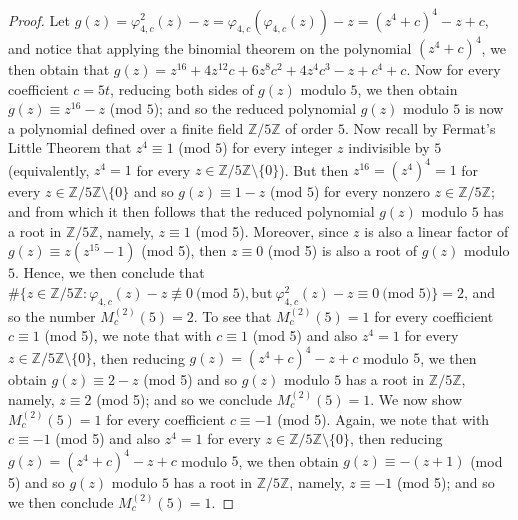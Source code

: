 \documentclass{article}
\theoremstyle{plain}
\theoremstyle{definition}
\begin{document}
\begin{proof}
Let $g(z)= \varphi_{4,c}^2(z)-z = \varphi_{4,c}(\varphi_{4,c}(z))-z = (z^4+c)^4 - z + c$, and notice that applying the binomial theorem on the polynomial $(z^4 + c)^4$, we then obtain that $g(z) = z^{16} + 4z^{12}c + 6z^8c^2 + 4z^4c^3 - z + c^4 + c$. Now for every coefficient $c=5t$, reducing both sides of $g(z)$ modulo $5$, we then obtain $g(z)\equiv z^{16} - z$ (mod $5$); and so the reduced polynomial $g(z)$ modulo $5$ is now a polynomial defined over a finite field $\mathbb{Z}\slash 5\mathbb{Z}$ of order $5$. Now recall by Fermat's Little Theorem that $z^4 \equiv 1$ (mod $5$) for every integer $z$ indivisible by $5$ (equivalently, $z^4 = 1$ for every $z\in \mathbb{Z}\slash5\mathbb{Z}\setminus \{0\}$). But then $z^{16}= (z^4)^4 = 1$ for every $z\in \mathbb{Z}\slash5\mathbb{Z}\setminus \{0\}$ and so $g(z)\equiv 1 - z$ (mod $5$) for every nonzero $z\in \mathbb{Z}\slash5\mathbb{Z}$; and from which it then follows that the reduced polynomial $g(z)$ modulo $5$ has a root in $\mathbb{Z}\slash 5\mathbb{Z}$, namely, $z\equiv 1$ (mod 5). Moreover, since $z$ is also a linear factor of $g(z)\equiv z(z^{15} - 1)$ (mod 5), then $z\equiv 0$ (mod 5) is also a root of $g(z)$ modulo $5$. Hence, we then conclude that $\#\{ z\in \mathbb{Z} / 5\mathbb{Z}: \varphi_{4,c}(z) -z \not \equiv 0 \ \text{(mod $5$)}, \text{but} \ \varphi_{4,c}^2(z) - z \equiv 0 \ \text{(mod $5$)}\} = 2$, and so the number $M_{c}^{(2)}(5) = 2$. To see that $M_{c}^{(2)}(5) = 1$ for every coefficient $c\equiv 1$ (mod 5), we note that with $c\equiv 1$ (mod 5) and also $z^4 = 1$ for every $z\in \mathbb{Z}\slash5\mathbb{Z}\setminus\{0\}$, then reducing $g(z)= (z^4+c)^4 - z + c$ modulo $5$, we then obtain $g(z)\equiv 2 - z$ (mod 5) and so $g(z)$ modulo $5$ has a root in $\mathbb{Z}\slash5\mathbb{Z}$, namely, $z\equiv 2$ (mod 5); and so we conclude $M_{c}^{(2)}(5) = 1$. We now show $M_{c}^{(2)}(5) = 1$ for every coefficient $c\equiv -1$ (mod 5). Again, we note that with $c \equiv -1$ (mod 5) and also $z^4 = 1$ for every $z\in \mathbb{Z}\slash5\mathbb{Z}\setminus \{0\}$, then reducing $g(z)= (z^4+c)^4 - z + c$ modulo $5$, we then obtain $g(z) \equiv -(z+1)$ (mod 5) and so $g(z)$ modulo $5$ has a root in $\mathbb{Z}\slash5\mathbb{Z}$, namely, $z\equiv -1$ (mod 5); and so we then conclude $M_{c}^{(2)}(5) = 1$. 


\end{proof}
\end{document}
